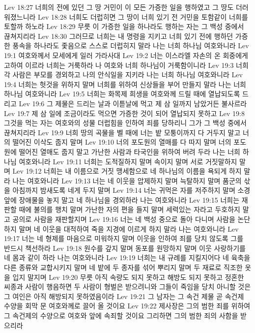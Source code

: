 Lev 18:27  너희의 전에 있던 그 땅 거민이 이 모든 가증한 일을 행하였고 그 땅도 더러워졌느니라
Lev 18:28  너희도 더럽히면 그 땅이 너희 있기 전 거민을 토함같이 너희를 토할까 하노라
Lev 18:29  무릇 이 가증한 일을 하나라도 행하는 자는 그 백성 중에서 끊쳐지리라
Lev 18:30  그러므로 너희는 내 명령을 지키고 너희 있기 전에 행하던 가증한 풍속을 하나라도 좇음으로 스스로 더럽히지 말라 나는 너희 하나님 여호와니라
Lev 19:1  여호와께서 모세에게 일러 가라사대
Lev 19:2  너는 이스라엘 자손의 온 회중에게 고하여 이르라 너희는 거룩하라 나 여호와 너희 하나님이 거룩함이니라
Lev 19:3  너희 각 사람은 부모를 경외하고 나의 안식일을 지키라 나는 너희 하나님 여호와니라
Lev 19:4  너희는 헛것을 위하지 말며 너희를 위하여 신상들을 부어 만들지 말라 나는 너희 하나님 여호와니라
Lev 19:5  너희는 화목제 희생을 여호와께 드릴 때에 열납되도록 드리고
Lev 19:6  그 제물은 드리는 날과 이튿날에 먹고 제 삼 일까지 남았거든 불사르라
Lev 19:7  제 삼 일에 조금이라도 먹으면 가증한 것이 되어 열납되지 못하고
Lev 19:8  그것을 먹는 자는 여호와의 성물 더럽힘을 인하여 죄를 당하리니 그가 그 백성 중에서 끊쳐지리라
Lev 19:9  너희 땅의 곡물을 벨 때에 너는 밭 모퉁이까지 다 거두지 말고 너의 떨어진 이삭도 줍지 말며
Lev 19:10  너의 포도원의 열매를 다 따지 말며 너의 포도원에 떨어진 열매도 줍지 말고 가난한 사람과 타국인을 위하여 버려 두라 나는 너희 하나님 여호와니라
Lev 19:11  너희는 도적질하지 말며 속이지 말며 서로 거짓말하지 말며
Lev 19:12  너희는 내 이름으로 거짓 맹세함으로 네 하나님의 이름을 욕되게 하지 말라 나는 여호와니라
Lev 19:13  너는 네 이웃을 압제하지 말며 늑탈하지 말며 품군의 삯을 아침까지 밤새도록 네게 두지 말며
Lev 19:14  너는 귀먹은 자를 저주하지 말며 소경 앞에 장애물을 놓지 말고 네 하나님을 경외하라 나는 여호와니라
Lev 19:15  너희는 재판할 때에 불의를 행치 말며 가난한 자의 편을 들지 말며 세력있는 자라고 두호하지 말고 공의로 사람을 재판할지며
Lev 19:16  너는 네 백성 중으로 돌아 다니며 사람을 논단하지 말며 네 이웃을 대적하여 죽을 지경에 이르게 하지 말라 나는 여호와니라
Lev 19:17  너는 네 형제를 마음으로 미워하지 말며 이웃을 인하여 죄를 당치 않도록 그를 반드시 책선하라
Lev 19:18  원수를 갚지 말며 동포를 원망하지 말며 이웃 사랑하기를 네 몸과 같이 하라 나는 여호와니라
Lev 19:19  너희는 내 규례를 지킬지어다 네 육축을 다른 종류와 교합시키지 말며 네 밭에 두 종자를 섞어 뿌리지 말며 두 재료로 직조한 옷을 입지 말지며
Lev 19:20  무릇 아직 속량도 되지 못하고 해방도 되지 못하고 정혼한 씨종과 사람이 행음하면 두 사람이 형벌은 받으려니와 그들이 죽임을 당치 아니할 것은 그 여인은 아직 해방되지 못하였음이라
Lev 19:21  그 남자는 그 속건 제물 곧 속건제 수양을 회막 문 여호와께로 끌어 올 것이요
Lev 19:22  제사장은 그의 범한 죄를 위하여 그 속건제의 수양으로 여호와 앞에 속죄할 것이요 그리하면 그의 범한 죄의 사함을 받으리라
